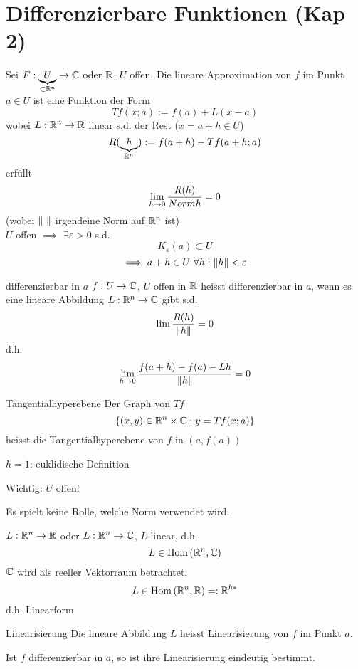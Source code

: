 \section{Differenzierbare Funktionen (Kap 2)}
\begin{Bem}
  Sei $F:\underbrace{U}_{\subset\mathbb{R}^n}\to\mathbb{C}$ oder $\mathbb{R}$. $U$ offen. Die lineare Approximation von $f$ im Punkt $a\in U$ ist eine Funktion der Form
  \[Tf(x;a):=f(a)+L(x-a)\]
  wobei $L:\mathbb{R}^n\to\mathbb{R}$ \underline{linear} s.d. der Rest ($x=a+h\in U$)
  \[R(\underbrace{h}_{\mathbb{R}^n}):=f(a+h)-Tf(a+h;a)\]
  erfüllt
  \[\displaystyle\lim_{h\rightarrow0}\frac{R(h)}{Norm{h}}=0\]
  (wobei $\left\| \  \right\|$ irgendeine Norm auf $\mathbb{R}^n$ ist)\\
  $U$ offen $\implies$ $\exists \varepsilon>0$ s.d.
  \[K_\varepsilon(a)\subset U\]
  \[\implies a+h\in U\ \forall h:\left\| h \right\|<\varepsilon\]
\end{Bem}
\begin{Def}{differenzierbar in $a$}
  $f:U\to\mathbb{C}$, $U$ offen in $\mathbb{R}$ heisst differenzierbar in $a$, wenn es eine lineare Abbildung $L:\mathbb{R}^n\to\mathbb{C}$ gibt s.d.
  \[\lim\frac{R(h)}{\left\| h \right\|}=0\]
  d.h.
  \[\displaystyle\lim_{h\rightarrow0}\frac{f(a+h)-f(a)-Lh}{\left\| h \right\|}=0\]
\end{Def}
\begin{Def}{Tangentialhyperebene}
  Der Graph von $Tf$
  \[\left\{ \left( x,y \right)\in \mathbb{R}^n\times \mathbb{C}:y=Tf(x;a) \right\}\]
  heisst die Tangentialhyperebene von $f$ in $(a,f(a))$
\end{Def}
\begin{Bem}
  $h=1$: euklidische Definition
\end{Bem}
\begin{Bem}
  Wichtig: $U$ offen!
\end{Bem}
\begin{Bem}
  Es spielt keine Rolle, welche Norm verwendet wird.
\end{Bem}
\begin{Bem}
  $L:\mathbb{R}^n\to\mathbb{R}$ oder $L:\mathbb{R}^n\to\mathbb{C}$, $L$ linear, d.h.
  \[L\in\operatorname{Hom}\left( \mathbb{R}^n,\mathbb{C} \right)\]
  $\mathbb{C}$ wird als reeller Vektorraum betrachtet.
  \[L\in\operatorname{Hom}\left( \mathbb{R}^n,\mathbb{R} \right)=:\mathbb{R}^{h*}\]
  d.h. Linearform
\end{Bem}
\begin{Def}{Linearisierung}
  Die lineare Abbildung $L$ heisst Linearisierung von $f$ im Punkt $a$.
\end{Def}
\begin{Lem}
  Ist $f$ differenzierbar in $a$, so ist ihre Linearisierung eindeutig bestimmt.
\end{Lem}
